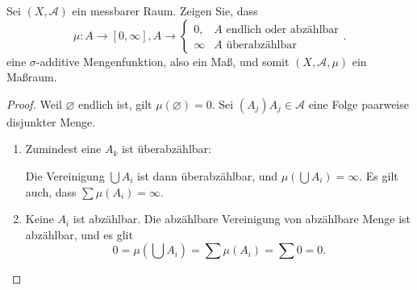 \begin{Problem}
	Sei $(X, \mathcal{A})$ ein messbarer Raum. Zeigen Sie, dass
	\[
		\mu:A\to[0,\infty], A\to \begin{cases}
			0, &A\text{ endlich oder abzählbar}\\
			\infty &A\text{ überabzählbar}
		\end{cases}
	.\] 
	eine $\sigma$-additive Mengenfunktion, also ein Maß, und somit $(X,\mathcal{A},\mu)$ ein Maßraum.
\end{Problem}

\begin{proof}
Weil $\varnothing$ endlich ist, gilt $\mu(\varnothing)=0$. Sei $(A_j)A_j\in \mathcal{A}$ eine Folge paarweise disjunkter Menge.
\begin{enumerate}
	\item Zumindest eine $A_k$ ist überabzählbar:

		Die Vereinigung $\bigcup A_i $ ist dann überabzählbar, und $\mu\left( \bigcup A_i  \right) =\infty$. Es gilt auch, dass $\sum \mu(A_i)=\infty$. 
	\item Keine $A_i$ ist abzählbar. Die abzählbare Vereinigung von abzählbare Menge ist abzählbar, und es glit
		\[
		0=\mu\left( \bigcup A_i  \right)=\sum \mu(A_i)=\sum 0=0 
		.\] 
\end{enumerate}
\end{proof}

